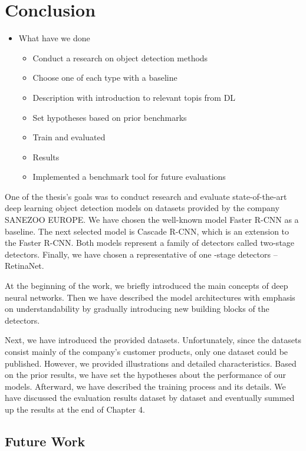 \chapter{Conclusion}
\begin{itemize}
    \item What have we done
          \begin{itemize}
              \item Conduct a research on object detection methods
              \item Choose one of each type with a baseline
              \item Description with introduction to relevant topis from DL
              \item Set hypotheses based on prior benchmarks
              \item Train and evaluated
              \item Results
              \item Implemented a benchmark tool for future evaluations
          \end{itemize}
\end{itemize}

One of the thesis's goals was to conduct research and evaluate state-of-the-art deep learning object detection models on datasets provided by the company SANEZOO EUROPE.
We have chosen the well-known model Faster R-CNN as a baseline. The next selected model is Cascade R-CNN, which is an extension to the Faster R-CNN. Both models represent a family of detectors called two-stage detectors. Finally, we have chosen a representative of one -stage detectors -- RetinaNet.

At the beginning of the work, we briefly introduced the main concepts of deep neural networks. Then we have described the model architectures with emphasis on understandability by gradually introducing new building blocks of the detectors.

Next, we have introduced the provided datasets. Unfortunately, since the datasets consist mainly of the company's customer products, only one dataset could be published. However, we provided illustrations and detailed characteristics. Based on the prior results, we have set the hypotheses about the performance of our models. Afterward, we have described the training process and its details. We have discussed the evaluation results dataset by dataset and eventually summed up the results at the end of Chapter 4.


\section{Future Work}